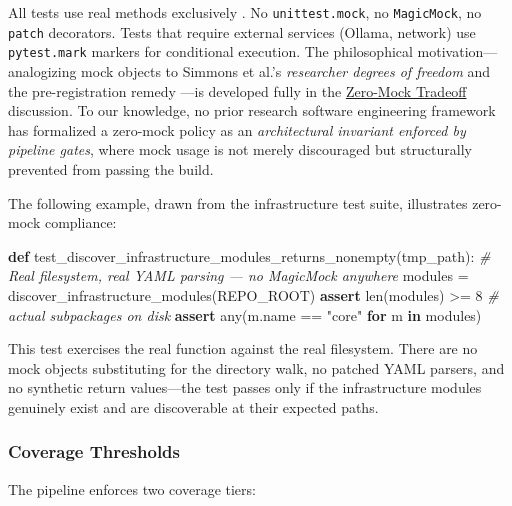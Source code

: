 \documentclass[
]{article}
\newenvironment{Shaded}{}{}
\newcommand{\BuiltInTok}[1]{\textcolor[rgb]{0.00,0.50,0.00}{#1}}
\newcommand{\CommentTok}[1]{\textcolor[rgb]{0.38,0.63,0.69}{\textit{#1}}}
\newcommand{\ControlFlowTok}[1]{\textcolor[rgb]{0.00,0.44,0.13}{\textbf{#1}}}
\newcommand{\DecValTok}[1]{\textcolor[rgb]{0.25,0.63,0.44}{#1}}
\newcommand{\KeywordTok}[1]{\textcolor[rgb]{0.00,0.44,0.13}{\textbf{#1}}}
\newcommand{\NormalTok}[1]{#1}
\newcommand{\OperatorTok}[1]{\textcolor[rgb]{0.40,0.40,0.40}{#1}}
\newcommand{\StringTok}[1]{\textcolor[rgb]{0.25,0.44,0.63}{#1}}
\newcounter{none} %
\begin{document}
All tests use real methods exclusively
\citep{martin2008clean, meszaros2007xunit}. No \texttt{unittest.mock},
no \texttt{MagicMock}, no \texttt{patch} decorators. Tests that require
external services (Ollama, network) use \texttt{pytest.mark} markers for
conditional execution. The philosophical motivation---analogizing mock
objects to Simmons et al.'s \emph{researcher degrees of freedom}
\citep{simmons2011falsepositive} and the pre-registration remedy
\citep{nosek2018preregistration}---is developed fully in the
\href{05a_zeromock_tradeoff.md\#the-zero-mock-tradeoff}{Zero-Mock
Tradeoff} discussion. To our knowledge, no prior research software
engineering framework has formalized a zero-mock policy as an
\emph{architectural invariant enforced by pipeline gates}, where mock
usage is not merely discouraged but structurally prevented from passing
the build.

The following example, drawn from the infrastructure test suite,
illustrates zero-mock compliance:

\begin{Shaded}
\begin{Highlighting}[]
\KeywordTok{def}\NormalTok{ test\_discover\_infrastructure\_modules\_returns\_nonempty(tmp\_path):}
    \CommentTok{\# Real filesystem, real YAML parsing — no MagicMock anywhere}
\NormalTok{    modules }\OperatorTok{=}\NormalTok{ discover\_infrastructure\_modules(REPO\_ROOT)}
    \ControlFlowTok{assert} \BuiltInTok{len}\NormalTok{(modules) }\OperatorTok{\textgreater{}=} \DecValTok{8}           \CommentTok{\# actual subpackages on disk}
    \ControlFlowTok{assert} \BuiltInTok{any}\NormalTok{(m.name }\OperatorTok{==} \StringTok{"core"} \ControlFlowTok{for}\NormalTok{ m }\KeywordTok{in}\NormalTok{ modules)}
\end{Highlighting}
\end{Shaded}

This test exercises the real 
function against the real filesystem. There are no mock objects
substituting for the directory walk, no patched YAML parsers, and no
synthetic return values---the test passes only if the infrastructure
modules genuinely exist and are discoverable at their expected paths.

\subsubsection{Coverage Thresholds}\label{coverage-thresholds}

The pipeline enforces two coverage tiers:
\end{document}
